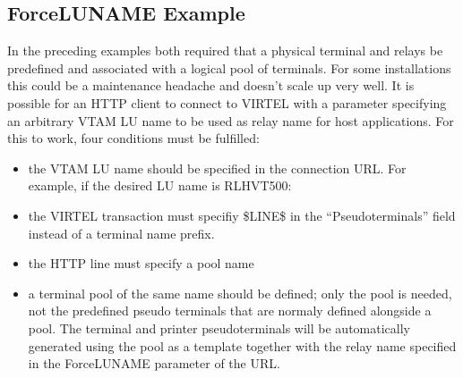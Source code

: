 \documentclass[letterpaper,10pt,english]{sphinxmanual}
\begin{document}
\subsection{ForceLUNAME Example}
\label{\detokenize{connectivity_guide:forceluname-example}}\label{\detokenize{connectivity_guide:index-155}}
\sphinxAtStartPar
In the preceding examples both required that a physical terminal and relays be predefined and associated with a logical pool of terminals. For some installations this could be a maintenance headache and doesn’t scale up very well. It is possible for an HTTP client to connect to VIRTEL with a parameter specifying an arbitrary VTAM LU name to be used as relay name for host applications. For this to work, four conditions must be fulfilled:\sphinxhyphen{}
\begin{itemize}
\item {} 
\sphinxAtStartPar
the VTAM LU name should be specified in the connection URL. For example, if the desired LU name is RLHVT500:

\end{itemize}

\begin{sphinxVerbatim}[commandchars=\\\{\}]
\end{sphinxVerbatim}
\begin{itemize}
\item {} 
\sphinxAtStartPar
the VIRTEL transaction must specifiy \$LINE\$ in the “Pseudo\sphinxhyphen{}terminals” field instead of a terminal name prefix.

\item {} 
\sphinxAtStartPar
the HTTP line must specify a pool name

\item {} 
\sphinxAtStartPar
a terminal pool of the same name should be defined; only the pool is needed, not the predefined pseudo\sphinxhyphen{} terminals that are normaly defined alongside a pool. The terminal and printer pseudo\sphinxhyphen{}terminals will be automatically generated using the pool as a template together with the relay name specified in the ForceLUNAME parameter of the URL.

\end{itemize}
\end{document}
